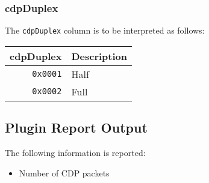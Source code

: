 \documentclass[documentation]{subfiles}
\begin{document}
\subsubsection{cdpDuplex}\label{cdpDuplex}
The {\tt cdpDuplex} column is to be interpreted as follows:
\begin{longtable}{rl}
    \toprule
    {\bf cdpDuplex} & {\bf Description}\\
    \midrule\endhead%
    {\tt 0x0001} & Half\\
    {\tt 0x0002} & Full\\
    \bottomrule
\end{longtable}


\subsection{Plugin Report Output}
The following information is reported:
\begin{itemize}
    \item Number of CDP packets
\end{itemize}


%
%
\end{document}
